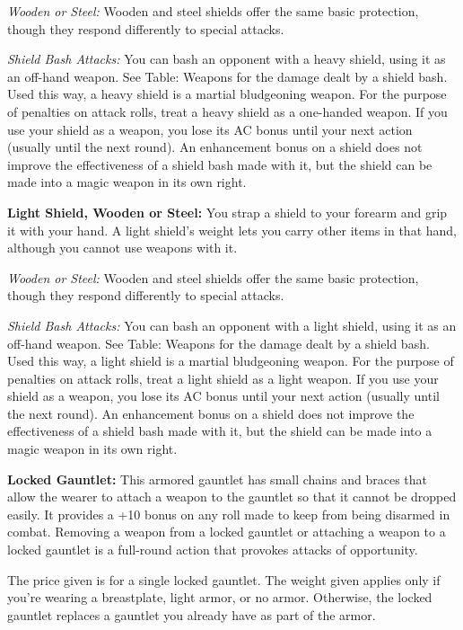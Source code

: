 \textit{Wooden or Steel:} Wooden and steel shields offer the same basic protection, 
though they respond differently to special attacks.

\textit{Shield Bash Attacks:} You can bash an opponent with a heavy shield, using 
it as an off-hand weapon. See Table: Weapons for the damage dealt by a shield bash. 
Used this way, a heavy shield is a martial bludgeoning weapon. For the purpose 
of penalties on attack rolls, treat a heavy shield as a one-handed weapon. If you 
use your shield as a weapon, you lose its AC bonus until your next action (usually 
until the next round). An enhancement bonus on a shield does not improve the effectiveness 
of a shield bash made with it, but the shield can be made into a magic weapon in 
its own right.

\textbf{Light Shield, Wooden or Steel:} You strap a shield to your forearm and 
grip it with your hand. A light shield's weight lets you carry other items in that 
hand, although you cannot use weapons with it.

\textit{Wooden or Steel:} Wooden and steel shields offer the same basic protection, 
though they respond differently to special attacks.

\textit{Shield Bash Attacks:} You can bash an opponent with a light shield, using 
it as an off-hand weapon. See Table: Weapons for the damage dealt by a shield bash. 
Used this way, a light shield is a martial bludgeoning weapon. For the purpose 
of penalties on attack rolls, treat a light shield as a light weapon. If you use 
your shield as a weapon, you lose its AC bonus until your next action (usually 
until the next round). An enhancement bonus on a shield does not improve the effectiveness 
of a shield bash made with it, but the shield can be made into a magic weapon in 
its own right.

\textbf{Locked Gauntlet:} This armored gauntlet has small chains and braces that 
allow the wearer to attach a weapon to the gauntlet so that it cannot be dropped 
easily. It provides a +10 bonus on any roll made to keep from being disarmed in 
combat. Removing a weapon from a locked gauntlet or attaching a weapon to a locked 
gauntlet is a full-round action that provokes attacks of opportunity.

The price given is for a single locked gauntlet. The weight given applies only 
if you're wearing a breastplate, light armor, or no armor. Otherwise, the locked 
gauntlet replaces a gauntlet you already have as part of the armor.

